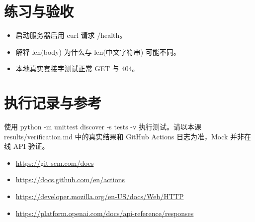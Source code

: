 \documentclass[UTF8,11pt,a4paper]{ctexart}
\begin{document}
\section{练习与验收}
\begin{itemize}
\item 启动服务器后用 curl 请求 /health。
\item 解释 len(body) 为什么与 len(中文字符串) 可能不同。
\item 本地真实套接字测试正常 GET 与 404。
\end{itemize}
\section{执行记录与参考}
使用 python -m unittest discover -s tests -v 执行测试。请以本课 results/verification.md 中的真实结果和 GitHub Actions 日志为准，Mock 并非在线 API 验证。
\begin{itemize}
\item \url{https://git-scm.com/docs}
\item \url{https://docs.github.com/en/actions}
\item \url{https://developer.mozilla.org/en-US/docs/Web/HTTP}
\item \url{https://platform.openai.com/docs/api-reference/responses}
\end{itemize}
\end{document}
